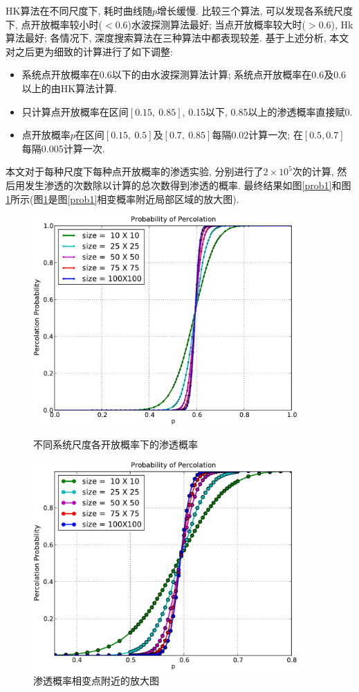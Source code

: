 \documentclass[11pt,a4paper,boxed]{caspset}
\begin{document}
HK算法在不同尺度下, 耗时曲线随$p$增长缓慢. 比较三个算法, 可以发现各系统尺度下, 点开放概率较小时($<0.6$)水波探测算法最好; 当点开放概率较大时($>0.6$), Hk算法最好; 各情况下, 深度搜索算法在三种算法中都表现较差. 基于上述分析, 本文对之后更为细致的计算进行了如下调整:
\begin{itemize}
\item 系统点开放概率在0.6以下的由水波探测算法计算; 系统点开放概率在0.6及0.6以上的由HK算法计算.
\item 只计算点开放概率在区间$[0.15,{~}0.85]$, 0.15以下, 0.85以上的渗透概率直接赋0.
\item 点开放概率$p$在区间$[0.15,{~}0.5]$及$[0.7,{~}0.85]$每隔0.02计算一次; 在$[0.5, 0.7]$每隔0.005计算一次.
\end{itemize}
本文对于每种尺度下每种点开放概率的渗透实验, 分别进行了$2\times10^5$次的计算, 然后用发生渗透的次数除以计算的总次数得到渗透的概率. 最终结果如图\ref{prob1}和图\ref{prob2}所示(图\ref{prob2}是图\ref{prob1}相变概率附近局部区域的放大图).
\begin{figure}[!htb]
\begin{minipage}[b]{.5\textwidth}
\centering
\includegraphics[width=0.9\textwidth]{prob1.pdf}
\caption{\label{prob1}不同系统尺度各开放概率下的渗透概率}
\end{minipage}
\begin{minipage}[b]{.5\textwidth}
\centering
\includegraphics[width=0.9\textwidth]{prob2.pdf}
\caption{\label{prob2}渗透概率相变点附近的放大图}
\end{minipage}
\end{figure}
\end{document}
